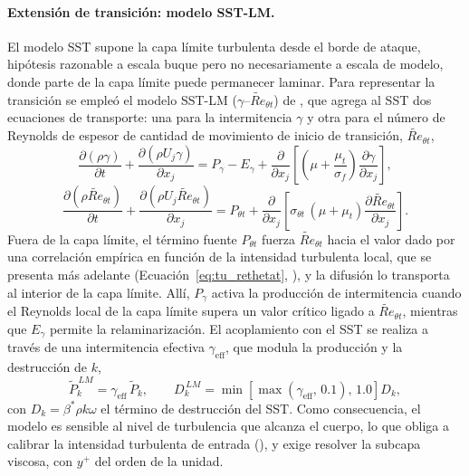 \paragraph{Extensión de transición: modelo SST-LM.}
\label{sec:metodo_sstlm}
El modelo SST supone la capa límite turbulenta desde el borde de ataque, hipótesis razonable a escala buque pero no necesariamente a escala de modelo, donde parte de la capa límite puede permanecer laminar. Para representar la transición se empleó el modelo SST-LM ($\gamma$--$\widetilde{Re}_{\theta t}$) de \citet{langtry2009}, que agrega al SST dos ecuaciones de transporte: una para la intermitencia $\gamma$ y otra para el número de Reynolds de espesor de cantidad de movimiento de inicio de transición, $\widetilde{Re}_{\theta t}$,
%
\begin{equation}
    \frac{\partial (\rho \gamma)}{\partial t} + \frac{\partial (\rho U_j \gamma)}{\partial x_j}
    = P_\gamma - E_\gamma + \frac{\partial}{\partial x_j}\left[\left(\mu + \frac{\mu_t}{\sigma_f}\right)\frac{\partial \gamma}{\partial x_j}\right],
\end{equation}
%
\begin{equation}
    \frac{\partial (\rho \widetilde{Re}_{\theta t})}{\partial t} + \frac{\partial (\rho U_j \widetilde{Re}_{\theta t})}{\partial x_j}
    = P_{\theta t} + \frac{\partial}{\partial x_j}\left[\sigma_{\theta t}\,(\mu + \mu_t)\frac{\partial \widetilde{Re}_{\theta t}}{\partial x_j}\right].
\end{equation}
%
Fuera de la capa límite, el término fuente $P_{\theta t}$ fuerza
$\widetilde{Re}_{\theta t}$ hacia el valor dado por una correlación empírica en función de la intensidad turbulenta local, que se presenta más adelante (Ecuación~\eqref{eq:tu_rethetat}, ),
y la difusión lo transporta al interior de la capa límite. Allí, $P_\gamma$ activa la producción de intermitencia cuando el Reynolds local de la capa límite supera un valor crítico ligado a $\widetilde{Re}_{\theta t}$, mientras que $E_\gamma$ permite la relaminarización. El acoplamiento con el SST se realiza a través de una intermitencia efectiva $\gamma_{\mathrm{eff}}$, que modula la producción y la destrucción de $k$,
%
\begin{equation}
    \tilde{P}_k^{\,LM} = \gamma_{\mathrm{eff}}\,\tilde{P}_k, \qquad
    D_k^{\,LM} = \min\!\left[\max\left(\gamma_{\mathrm{eff}},\,0.1\right),\,1.0\right] D_k,
\end{equation}
%
con $D_k = \beta^*\rho k\omega$ el término de destrucción del SST. Como consecuencia, el modelo es sensible al nivel de turbulencia que alcanza el cuerpo, lo que obliga a calibrar la intensidad turbulenta de entrada (), y exige resolver la subcapa viscosa, con $y^+$ del orden de la unidad.

